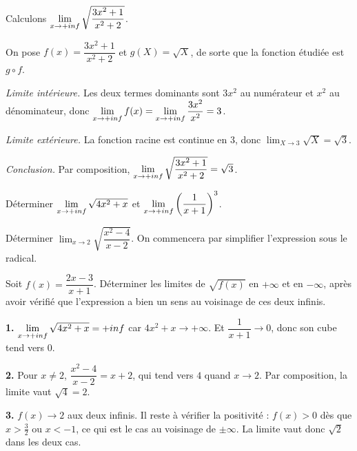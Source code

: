 
\begin{exemple}
Calculons $\limpinf \sqrt{\dfrac{3x^{2}+1}{x^{2}+2}}$.

On pose $f(x) = \dfrac{3x^{2}+1}{x^{2}+2}$ et $g(X) = \sqrt{X}$, de sorte que
la fonction étudiée est $g \circ f$.

\smallskip
\emph{Limite intérieure.} Les deux termes dominants sont $3x^{2}$ au numérateur
et $x^{2}$ au dénominateur, donc
$\limpinf f(x) = \limpinf \dfrac{3x^{2}}{x^{2}} = 3$.

\smallskip
\emph{Limite extérieure.} La fonction racine est continue en $3$, donc
$\lim_{X \to 3} \sqrt{X} = \sqrt{3}$.

\smallskip
\emph{Conclusion.} Par composition,
$\limpinf \sqrt{\dfrac{3x^{2}+1}{x^{2}+2}} = \sqrt{3}$.
\end{exemple}

\begin{entrainement}
\exo[\niveau{1}] Déterminer $\limpinf \sqrt{4x^{2}+x}$ et
$\limpinf \left(\dfrac{1}{x+1}\right)^{3}$.

\exo[\niveau{2}] Déterminer $\displaystyle\lim_{x \to 2} \sqrt{\dfrac{x^{2}-4}{x-2}}$.
On commencera par simplifier l'expression sous le radical.

\exo[\niveau{2}] Soit $f(x) = \dfrac{2x-3}{x+1}$. Déterminer les limites de
$\sqrt{f(x)}$ en $+\infty$ et en $-\infty$, après avoir vérifié que
l'expression a bien un sens au voisinage de ces deux infinis.
\end{entrainement}

\begin{corrige}
\textbf{1.} $\limpinf \sqrt{4x^{2}+x} = +\infty$ car $4x^{2}+x \to +\infty$.
Et $\dfrac{1}{x+1} \to 0$, donc son cube tend vers $0$.

\textbf{2.} Pour $x \neq 2$, $\dfrac{x^{2}-4}{x-2} = x+2$, qui tend vers $4$
quand $x \to 2$. Par composition, la limite vaut $\sqrt{4} = 2$.

\textbf{3.} $f(x) \to 2$ aux deux infinis. Il reste à vérifier la positivité :
$f(x) > 0$ dès que $x > \tfrac{3}{2}$ ou $x < -1$, ce qui est le cas au
voisinage de $\pm\infty$. La limite vaut donc $\sqrt{2}$ dans les deux cas.
\end{corrige}

